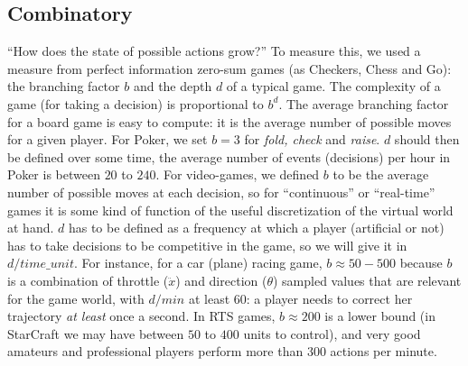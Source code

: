 \subsection{Combinatory}
``How does the state of possible actions grow?'' To measure this, we used a measure from perfect information zero-sum games (as Checkers, Chess and Go): the branching factor $b$ and the depth $d$ of a typical game. The complexity of a game (for taking a decision) is proportional to $b^d$. The average branching factor for a board game is easy to compute: it is the average number of possible moves for a given player. For Poker, we set $b=3$ for \textit{fold, check} and \textit{raise}. $d$ should then be defined over some time, the average number of events (decisions) per hour in Poker is between $20$ to $240$. For video-games, we defined $b$ to be the average number of possible moves at each decision, so for ``continuous'' or ``real-time'' games it is some kind of function of the useful discretization of the virtual world at hand. $d$ has to be defined as a frequency at which a player (artificial or not) has to take decisions to be competitive in the game, so we will give it in $d/time\_unit$. For instance, for a car (plane) racing game, $b \approx 50-500$ because $b$ is a combination of throttle ($\ddot{x}$) and direction ($\theta$) sampled values that are relevant for the game world, with $d/min$ at least $60$: a player needs to correct her trajectory \textit{at least} once a second. In RTS games, $b \approx 200$ is a lower bound (in StarCraft we may have between $50$ to $400$ units to control), and very good amateurs and professional players perform more than $300$ actions per minute.

